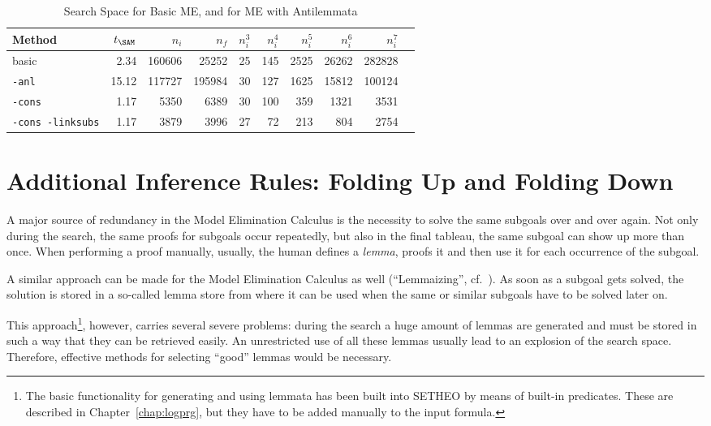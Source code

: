 \begin{table}[htb]
\begin{center}
\begin{tabular}{|l|r|r|r||r|r|r|r|r|r|}
\hline
Method & $t_{\SAM}$ & $n_i$ & $n_f$ & 
	$n_i^3$ & $n_i^4$ & $n_i^5$ & $n_i^6$ & $n_i^7$ \\
\hline\hline
basic & 2.34 & 160606 & 25252 &
	25 & 145 & 2525 & 26262 & 282828 \\
\hline
{\tt -anl} & 15.12 & 117727 & 195984 &
	30 & 127 & 1625 & 15812 & 100124 \\
\hline
{\tt -cons} & 1.17 & 5350 & 6389 &
	30 & 100 & 359 & 1321 & 3531 \\
\hline
{\tt -cons -linksubs} & 1.17 & 3879 & 3996 &
	27 & 72 & 213 & 804 & 2754 \\
\hline\hline
\end{tabular}
\end{center}
\caption{Search Space for Basic ME, and for ME with Antilemmata}
\label{tab:tut2:results.anl}
\end{table}



\section{Additional Inference Rules: Folding Up and Folding Down}

A major source of redundancy in the Model Elimination Calculus is
the necessity to solve the same subgoals over and over again.
Not only during the search, the same proofs for subgoals occur
repeatedly, but also in the final tableau, the same subgoal can show
up more than once. 
When performing a proof manually, usually, the human defines a {\em lemma\/},
proofs it and then use it for each occurrence of the subgoal.

A similar approach can be made for the Model Elimination Calculus as well
(``Lemmaizing'', cf.\ \cite{METEOR}). As soon as a subgoal gets solved,
the solution is stored in a so-called lemma store from where it can be used
when the same or similar subgoals have to be solved later on.

This approach\footnote{
	The basic functionality for generating and using lemmata has
	been built into SETHEO by means of built-in predicates. 
	These are described in Chapter~\ref{chap:logprg}, but they
	have to be added manually to the input formula.},
however, carries several severe problems: 
during the search a huge amount of lemmas are generated and must be stored
in such a way that they can be retrieved easily. An unrestricted use of
all these lemmas usually lead to an explosion of the search space.
Therefore, effective methods for selecting ``good'' lemmas would be
necessary.

